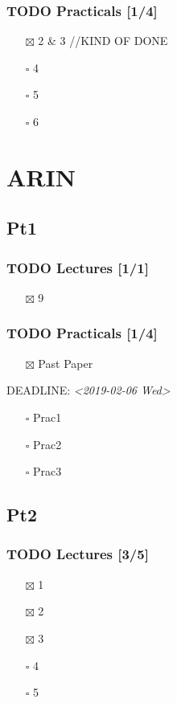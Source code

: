 \documentclass[11pt]{article}
\begin{document}
\subsubsection{{\bfseries\sffamily TODO} Practicals [1/4]}
\label{sec:orgf03f650}
\begin{itemize}
\item[{$\boxtimes$}] 2 \& 3 //KIND OF DONE
\item[{$\square$}] 4
\item[{$\square$}] 5
\item[{$\square$}] 6
\end{itemize}
\section{ARIN}
\label{sec:orgec8daa8}
\subsection{Pt1}
\label{sec:orgfdf6488}
\subsubsection{{\bfseries\sffamily TODO} Lectures [1/1]}
\label{sec:org7d913a0}
\begin{itemize}
\item[{$\boxtimes$}] 9
\end{itemize}
\subsubsection{{\bfseries\sffamily TODO} Practicals [1/4]}
\label{sec:org2eea171}
\begin{itemize}
\item[{$\boxtimes$}] Past Paper
\end{itemize}
DEADLINE: \textit{<2019-02-06 Wed>}
\begin{itemize}
\item[{$\square$}] Prac1
\item[{$\square$}] Prac2
\item[{$\square$}] Prac3
\end{itemize}
\subsection{Pt2}
\label{sec:org3f8002e}
\subsubsection{{\bfseries\sffamily TODO} Lectures [3/5]}
\label{sec:org75dc903}
\begin{itemize}
\item[{$\boxtimes$}] 1
\item[{$\boxtimes$}] 2
\item[{$\boxtimes$}] 3
\item[{$\square$}] 4
\item[{$\square$}] 5
\end{itemize}
\end{document}
